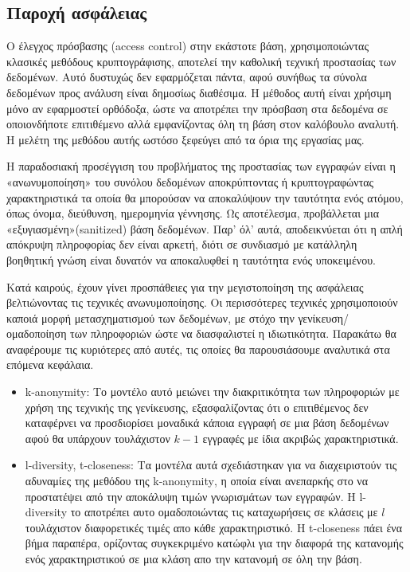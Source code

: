 \subsection{Παροχή ασφάλειας}

Ο έλεγχος πρόσβασης (\textlatin{access control}) στην εκάστοτε βάση, χρησιμοποιώντας κλασικές μεθόδους κρυπτογράφισης, αποτελεί την καθολική τεχνική προστασίας των δεδομένων. Αυτό δυστυχώς δεν εφαρμόζεται πάντα, αφού συνήθως τα σύνολα δεδομένων προς ανάλυση είναι δημοσίως διαθέσιμα. Η μέθοδος αυτή είναι χρήσιμη μόνο αν εφαρμοστεί ορθόδοξα, ώστε να αποτρέπει την πρόσβαση στα δεδομένα σε οποιονδήποτε επιτιθέμενο αλλά εμφανίζοντας όλη τη βάση στον καλόβουλο αναλυτή. Η μελέτη της μεθόδου αυτής ωστόσο ξεφεύγει από τα όρια της εργασίας μας.

Η παραδοσιακή προσέγγιση του προβλήματος της προστασίας των εγγραφών είναι η «ανωνυμοποίηση» του συνόλου δεδομένων αποκρύπτοντας ή κρυπτογραφώντας χαρακτηριστικά τα οποία θα μπορούσαν να αποκαλύψουν την ταυτότητα ενός ατόμου, όπως όνομα, διεύθυνση, ημερομηνία γέννησης. Ως αποτέλεσμα, προβάλλεται μια «εξυγιασμένη»\textlatin{(sanitized)} βάση δεδομένων. Παρ' όλ' αυτά, αποδεικνύεται ότι η απλή απόκρυψη πληροφορίας δεν είναι αρκετή, διότι σε συνδιασμό με κατάλληλη βοηθητική γνώση είναι δυνατόν να αποκαλυφθεί η ταυτότητα ενός υποκειμένου.

Κατά καιρούς, έχουν γίνει προσπάθειες για την μεγιστοποίηση της ασφάλειας βελτιώνοντας τις τεχνικές ανωνυμοποίησης. Οι περισσότερες τεχνικές χρησιμοποιούν καποιά μορφή μετασχηματισμού των δεδομένων, με στόχο την γενίκευση/ομαδοποίηση των πληροφοριών ώστε να διασφαλιστεί η ιδιωτικότητα. Παρακάτω θα αναφέρουμε τις κυριότερες από αυτές, τις οποίες θα παρουσιάσουμε αναλυτικά στα επόμενα κεφάλαια.
\begin{itemize}
\item \textlatin{k-anonymity}: Το μοντέλο αυτό μειώνει την διακριτικότητα των πληροφοριών με χρήση της τεχνικής της γενίκευσης, εξασφαλίζοντας ότι ο επιτιθέμενος δεν καταφέρνει να προσδιορίσει μοναδικά κάποια εγγραφή σε μια βάση δεδομένων αφού θα υπάρχουν τουλάχιστον $k-1$ εγγραφές με ίδια ακριβώς χαρακτηριστικά. 
\item \textlatin{l-diversity, t-closeness}: Τα μοντέλα αυτά σχεδιάστηκαν για να διαχειριστούν τις αδυναμίες της μεθόδου της \textlatin{k-anonymity}, η οποία είναι ανεπαρκής στο να προστατέψει από την αποκάλυψη τιμών γνωρισμάτων των εγγραφών. Η \textlatin{l-diversity} το αποτρέπει αυτο ομαδοποιώντας τις καταχωρήσεις σε κλάσεις με $l$ τουλάχιστον διαφορετικές τιμές απο κάθε χαρακτηριστικό. Η \textlatin{t-closeness} πάει ένα βήμα παραπέρα, ορίζοντας συγκεκριμένο κατώφλι για την διαφορά της κατανομής ενός χαρακτηριστικού σε μια κλάση απο την κατανομή σε όλη την βάση.
\end{itemize}



